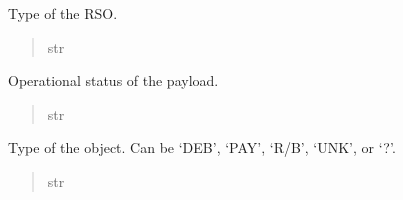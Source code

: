 \documentclass[letterpaper,10pt,english]{sphinxmanual}
\begin{document}
\begin{fulllineitems}
\begin{fulllineitems}
\begin{quote}
\begin{description}
\end{description}\end{quote}

\end{fulllineitems}


\begin{fulllineitems}
\label{\detokenize{fspsim.utils:fspsim.utils.SpaceObject.SpaceObject.rso_type}}
\pysigstartsignatures
{}
\pysigstopsignatures
\sphinxAtStartPar
Type of the RSO.
\begin{quote}\begin{description}
\sphinxAtStartPar
str

\end{description}\end{quote}

\end{fulllineitems}


\begin{fulllineitems}
\label{\detokenize{fspsim.utils:fspsim.utils.SpaceObject.SpaceObject.payload_operational_status}}
\pysigstartsignatures
{}
\pysigstopsignatures
\sphinxAtStartPar
Operational status of the payload.
\begin{quote}\begin{description}
\sphinxAtStartPar
str

\end{description}\end{quote}

\end{fulllineitems}


\begin{fulllineitems}
\label{\detokenize{fspsim.utils:fspsim.utils.SpaceObject.SpaceObject.object_type}}
\pysigstartsignatures
{}
\pysigstopsignatures
\sphinxAtStartPar
Type of the object. Can be ‘DEB’, ‘PAY’, ‘R/B’, ‘UNK’, or ‘?’.
\begin{quote}\begin{description}
\sphinxAtStartPar
str


\end{description}
\end{quote}
\end{fulllineitems}
\end{fulllineitems}
\end{document}
